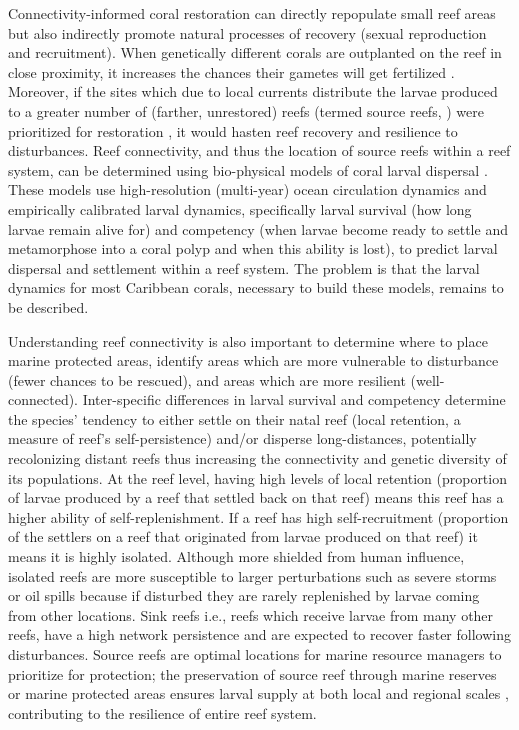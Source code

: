 \documentclass[preprint,12pt,authoryear]{elsarticle}
\begin{document}
Connectivity-informed coral restoration can directly repopulate small reef areas but also indirectly promote natural processes of recovery (sexual reproduction and recruitment). When genetically different corals are outplanted on the reef in close proximity, it increases the chances their gametes will get fertilized \citep{omori2019coral}. Moreover, if the sites which due to local currents distribute the larvae produced to a greater number of (farther, unrestored) reefs (termed source reefs, \citealp{bode2018resilient}) were prioritized for restoration \citep{king2023larval}, it would hasten reef recovery and resilience to disturbances. Reef connectivity, and thus the location of source reefs within a reef system, can be determined using bio-physical models of coral larval dispersal \citep{frys2020fine, figueiredo2022global,king2023larval}. These models use high-resolution (multi-year) ocean circulation dynamics and empirically calibrated larval dynamics, specifically larval survival (how long larvae remain alive for) and competency (when larvae become ready to settle and metamorphose into a coral polyp and when this ability is lost), to predict larval dispersal and settlement within a reef system. The problem is that the larval dynamics for most Caribbean corals, necessary to build these models, remains to be described.

Understanding reef connectivity is also important to determine where to place marine protected areas, identify areas which are more vulnerable to disturbance (fewer chances to be rescued), and areas which are more resilient (well-connected). Inter-specific differences in larval survival and competency determine the species’ tendency to either settle on their natal reef (local retention, a measure of reef’s self-persistence) and/or disperse long-distances, potentially recolonizing distant reefs thus increasing the connectivity and genetic diversity of its populations. At the reef level, having high levels of local retention (proportion of larvae produced by a reef that settled back on that reef) means this reef has a higher ability of self-replenishment. If a reef has high self-recruitment (proportion of the settlers on a reef that originated from larvae produced on that reef) it means it is highly isolated.  Although more shielded from human influence, isolated reefs are more susceptible to larger perturbations such as severe storms or oil spills \citep{baumann2022remoteness} because if disturbed they are rarely replenished by larvae coming from other locations. Sink reefs i.e., reefs which receive larvae from many other reefs, have a high network persistence and are expected to recover faster following disturbances. Source reefs are optimal locations for marine resource managers to prioritize for protection; the preservation of source reef through marine reserves or marine protected areas ensures larval supply at both local and regional scales \citep{muenzel2023integrating}, contributing to the resilience of entire reef system.
\end{document}
